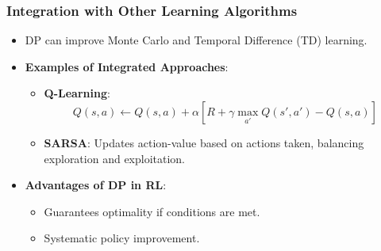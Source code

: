 \documentclass[aspectratio=169]{beamer}
\begin{document}
\begin{frame}[fragile]
    \frametitle{Integration with Other Learning Algorithms}
    \begin{itemize}
        \item DP can improve Monte Carlo and Temporal Difference (TD) learning.
        \item \textbf{Examples of Integrated Approaches}:
        \begin{itemize}
            \item \textbf{Q-Learning}:
            \begin{equation}
            Q(s, a) \leftarrow Q(s, a) + \alpha \left[ R + \gamma \max_{a'} Q(s', a') - Q(s, a) \right]
            \end{equation}
            \item \textbf{SARSA}:
            Updates action-value based on actions taken, balancing exploration and exploitation.
        \end{itemize}
        
        \item \textbf{Advantages of DP in RL}:
        \begin{itemize}
            \item Guarantees optimality if conditions are met.
            \item Systematic policy improvement.
        \end{itemize}
    \end{itemize}
\end{frame}
\end{document}

